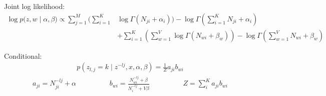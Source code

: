 \documentclass[10pt]{homeworg}
\begin{document}
 
Joint log likelihood:
\begin{align*}
\log{p(z,w \mid \alpha, \beta}) \propto \sum_{j=1}^M (\sum_{i=1}^K &\log{\Gamma(N_{ji} + \alpha_i)}) - \log{\Gamma(\sum_{i=1}^K N_{ji} + \alpha_i)}\\
& + \sum_{i=1}^K (\sum_{w=1}^V \log{\Gamma(N_{wi} + \beta_w)}) - \log{\Gamma(\sum_{w=1}^V N_{wi} + \beta_w)}
\end{align*}

Conditional:
\begin{align*}
p(z_{l,j} = k \mid z^{-lj}, x, \alpha, \beta) = \frac{1}{Z} a_{ji} b_{wi}
\end{align*}
\vspace{-0.5cm}
\begin{align*}
a_{ji} = N_{ji}^{-lj} + \alpha   \hspace{2cm}  b_{wi} = \frac{N_{wi}^{-lj} + \beta}{N_i^{-lj} + V\beta}  \hspace{2cm} Z = \sum_i^K a_{ji}b_{wi}
\end{align*}
\end{document}
